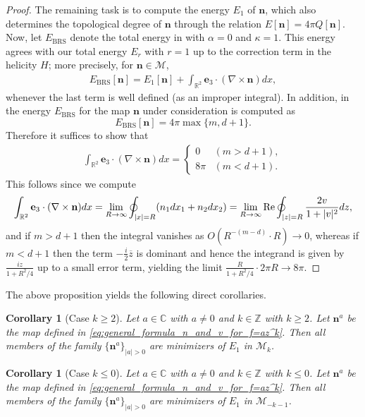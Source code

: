 \documentclass{amsart}
\numberwithin{equation}{section}
\newtheorem{corollary}[theorem]{Corollary}
\theoremstyle{definition}
\theoremstyle{remark}
\newcommand{\R}{\mathbb{R}}
\newcommand{\Z}{\mathbb{Z}}
\newcommand{\C}{\mathbb{C}}
\newcommand{\boM}{\mathcal{M}}
\renewcommand{\Re}{\mathop{{\rm Re}}\nolimits}
\newcommand{\ovl}[1]{\overline{#1}}					%
\newcommand{\bn}{{\mathbf{n}}}
\newcommand{\boe}{{\mathbf{e}}}
\begin{document}
\begin{proof}
    The remaining task is to compute the energy $E_1$ of $\bn$, which also determines the topological degree of $\bn$ through the relation $E[\bn]=4\pi Q[\bn]$.
    Now, let $E_\mathrm{BRS}$ denote the total energy in \cite{MR4091507} with $\alpha=0$ and $\kappa=1$.
    This energy agrees with our total energy $E_r$ with $r=1$ up to the correction term in the helicity $H$; more precisely, for $\bn\in\boM$,
    \begin{align}\label{eq:BRS_energy}
        E_\mathrm{BRS}[\bn] = E_1[\bn] + \int_{\R^2} \boe_3\cdot(\nabla\times\bn)dx,
    \end{align}
    whenever the last term is well defined (as an improper integral).
    In addition, in \cite[Lemma 4.2]{MR4091507} the energy $E_\mathrm{BRS}$ for the map $\bn$ under consideration is computed as
    \[
    E_\mathrm{BRS}[\bn]=4\pi\max\{m,d+1\}.
    \]
    Therefore it suffices to show that
    \begin{align*}
        \int_{\R^2} \boe_3\cdot(\nabla\times\bn)dx =
        \begin{cases}
            0 & (m>d+1),\\
            8\pi & (m<d+1).
        \end{cases}
    \end{align*}
    This follows since we compute
    \begin{align*}
        \int_{\R^2} \boe_3\cdot(\nabla\times\bn)dx = \lim_{R\to\infty}\oint_{|x|=R}(n_1dx_1+n_2dx_2) = \lim_{R\to\infty}\Re\oint_{|z|=R}\frac{2v}{1+|v|^2}dz,
    \end{align*}
    and if $m>d+1$ then the integral vanishes as $O(R^{-(m-d)}\cdot R)\to0$, whereas if $m<d+1$ then the term $-\frac{i}{2}\ovl{z}$ is dominant and hence the integrand is given by $\frac{iz}{1+R^2/4}$ up to a small error term, yielding the limit $\frac{R}{1+R^2/4}\cdot 2\pi R \to 8\pi$.
\end{proof}

The above proposition yields the following direct corollaries.

\begin{corollary}[Case $k\geq2$]
    Let $a\in\C$ with $a\neq0$ and $k\in\Z$ with $k\geq2$.
    Let $\bn^a$ be the map defined in \eqref{eq:general_formula_n_and_v_for_f=az^k}.
    Then all members of the family $\{\bn^a\}_{|a|>0}$ are minimizers of $E_1$ in $\boM_k$.
\end{corollary}

\begin{corollary}[Case $k\leq0$]
    Let $a\in\C$ with $a\neq0$ and $k\in\Z$ with $k\le 0$. 
    Let $\bn^a$ be the map defined in \eqref{eq:general_formula_n_and_v_for_f=az^k}. 
    Then all members of the family $\{\bn^a\}_{|a|>0}$ are minimizers of $E_1$ in $\boM_{-k-1}$. 
\end{corollary}
\end{document}
